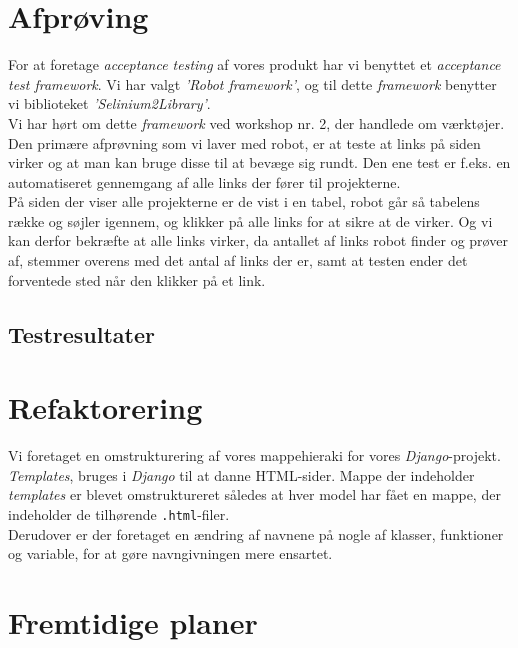 \documentclass[11pt]{article}
\begin{document}
\section{Afprøving}
For at foretage \textit{acceptance testing} af vores produkt har vi benyttet et \textit{acceptance test framework}. Vi har valgt \textit{'Robot framework'}, og til dette \textit{framework} benytter vi biblioteket \textit{'Selinium2Library'}. \\
Vi har hørt om dette \textit{framework} ved workshop nr. 2, der handlede om værktøjer.\\
Den primære afprøvning som vi laver med robot, er at teste at links på siden virker og at man kan bruge disse til at bevæge sig rundt. Den ene test er f.eks. en automatiseret gennemgang af alle links der fører til projekterne. \\
På siden der viser alle projekterne er de vist i en tabel, robot går så tabelens række og søjler igennem, og klikker på alle links for at sikre at de virker. Og vi kan derfor bekræfte at alle links virker, da antallet af links robot finder og prøver af, stemmer overens med det antal af links der er, samt at testen ender det forventede sted når den klikker på et link.

\subsection{Testresultater}

\section{Refaktorering}
Vi foretaget en omstrukturering af vores mappehieraki for vores \textit{Django}-projekt. \textit{Templates}, bruges i \textit{Django} til at danne HTML-sider. Mappe der indeholder \textit{templates} er blevet omstruktureret således at hver model har fået en mappe, der indeholder de tilhørende \texttt{.html}-filer. \\
Derudover er der foretaget en ændring af navnene på nogle af klasser, funktioner og variable, for at gøre navngivningen mere ensartet.

\section{Fremtidige planer}
\end{document}

